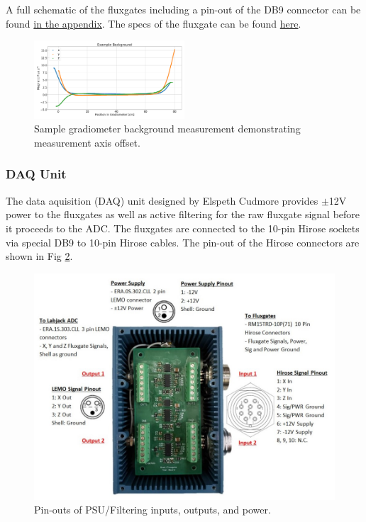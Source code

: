 \documentclass{TheMartianReport}
\begin{document}
A full schematic of the fluxgates including a pin-out of the DB9 connector can be found \hyperref[fig:FGschematic]{in the appendix}. The specs of the fluxgate can be found \href{https://ucn.triumf.ca/edm/magnetic-shielding/gradiometer-setup-at-triumf/Mag-03%20DS0013.pdf/view}{here}.

\begin{figure}
	\centering
	\includegraphics[width=0.5\textwidth]{sample_bg}
	\caption{Sample gradiometer background measurement demonstrating measurement axis offset.}
	\label{fig:FGbg}
\end{figure}

\subsubsection{DAQ Unit}
The data aquisition (DAQ) unit designed by Elspeth Cudmore provides $\pm$12V power to the fluxgates as well as active filtering for the raw fluxgate signal before it proceeds to the ADC. The fluxgates are connected to the 10-pin Hirose sockets via special DB9 to 10-pin Hirose cables. The pin-out of the Hirose connectors are shown in Fig \ref{fig:PSUpinouts}.

\begin{figure}[h]
	\centering
	\includegraphics[scale=0.5]{PSU_pinout}
	\caption{Pin-outs of PSU/Filtering inputs, outputs, and power.}
	\label{fig:PSUpinouts}
\end{figure}
\end{document}
